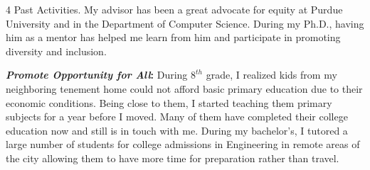 \documentclass[10pt]{article}
\makeatletter
\def \paragraph {%
    \@startsection{paragraph}%
        {4}%
        \z@\z@{-\fontdimen 6 \font}%
        {\large \scshape \bfseries}%
    }
\newcommand*\heading[1]{\textbf{\textit{#1}:}}
\makeatother
\begin{document}
\medskip
\paragraph{Past Activities.} 
My advisor has been a great advocate for equity at Purdue University and in the Department of Computer Science. During my Ph.D., having him as a mentor has helped me learn from him and participate in promoting diversity and inclusion.

%
%
%
\heading{Promote Opportunity for All}
During $8^{th}$ grade, I realized kids from my neighboring tenement home could not afford basic primary education due to their economic conditions. Being close to them, I started teaching them primary subjects for a year before I moved. Many of them have completed their college education now and still is in touch with me.
%
%
During my bachelor's, I tutored a large number of students for college admissions in Engineering in remote areas of the city allowing them to have more time for preparation rather than travel.
% 
\end{document}
